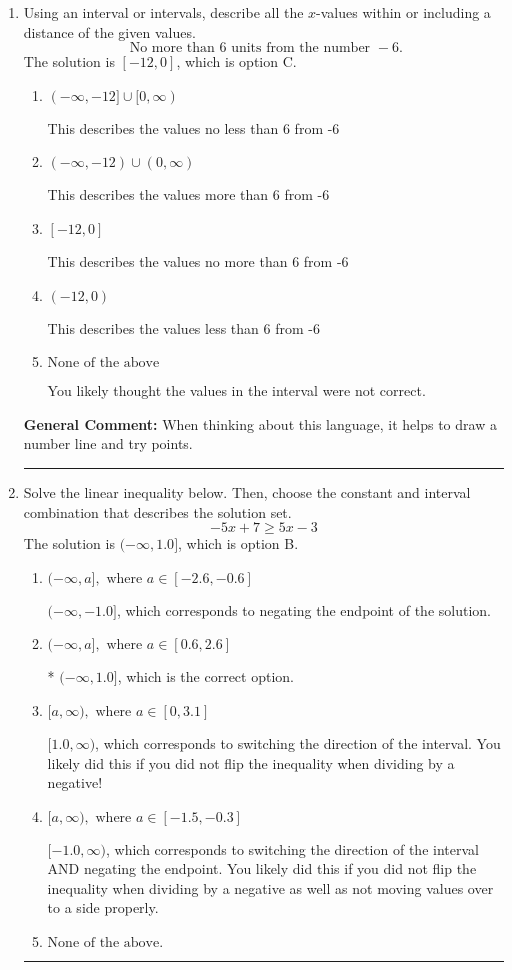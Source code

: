 \documentclass{extbook}[14pt]
\newcommand{\litem}[1]{\item #1

\rule{\textwidth}{0.4pt}}
\begin{document}
\begin{enumerate}\litem{
Using an interval or intervals, describe all the $x$-values within or including a distance of the given values.
\[ \text{ No more than } 6 \text{ units from the number } -6. \]The solution is \( [-12, 0] \), which is option C.\begin{enumerate}[label=\Alph*.]
\item \( (-\infty, -12] \cup [0, \infty) \)

This describes the values no less than 6 from -6
\item \( (-\infty, -12) \cup (0, \infty) \)

This describes the values more than 6 from -6
\item \( [-12, 0] \)

This describes the values no more than 6 from -6
\item \( (-12, 0) \)

This describes the values less than 6 from -6
\item \( \text{None of the above} \)

You likely thought the values in the interval were not correct.
\end{enumerate}

\textbf{General Comment:} When thinking about this language, it helps to draw a number line and try points.
}
\litem{
Solve the linear inequality below. Then, choose the constant and interval combination that describes the solution set.
\[ -5x + 7 \geq 5x -3 \]The solution is \( (-\infty, 1.0] \), which is option B.\begin{enumerate}[label=\Alph*.]
\item \( (-\infty, a], \text{ where } a \in [-2.6, -0.6] \)

 $(-\infty, -1.0]$, which corresponds to negating the endpoint of the solution.
\item \( (-\infty, a], \text{ where } a \in [0.6, 2.6] \)

* $(-\infty, 1.0]$, which is the correct option.
\item \( [a, \infty), \text{ where } a \in [0, 3.1] \)

 $[1.0, \infty)$, which corresponds to switching the direction of the interval. You likely did this if you did not flip the inequality when dividing by a negative!
\item \( [a, \infty), \text{ where } a \in [-1.5, -0.3] \)

 $[-1.0, \infty)$, which corresponds to switching the direction of the interval AND negating the endpoint. You likely did this if you did not flip the inequality when dividing by a negative as well as not moving values over to a side properly.
\item \( \text{None of the above}. \)


\end{enumerate}}
\end{enumerate}
\end{document}
